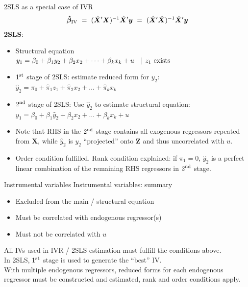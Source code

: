 \documentclass[usenames,dvipsnames]{beamer}
\begin{document}
\begin{frame}{2SLS as a special case of IVR}
$$
 \bm{\hat{\beta}}_{\textnormal{IV}} ~=~ 
 (\hat{\bm{X}}^{\prime}\bm{X})^{-1} \hat{\bm{X}}^{\prime}\bm{y} 
 ~=~ (\hat{\bm{X}}^{\prime}\hat{\bm{X}})^{-1} \hat{\bm{X}}^{\prime}\bm{y}
$$
\textbf{2SLS}: 
\begin{itemize}
\item Structural equation\\
\smallskip
$y_1=\beta_0+\beta_1 y_2+\beta_2 x_2+ \dots + \beta_k x_{k} +u \quad | ~z_1 \textnormal{~exists}$\\
\medskip
\item $1^{\textnormal{st}}$ stage of 2SLS: estimate reduced form for $y_2$:\\
\smallskip
$\hat{y}_2=\hat{\pi}_0+\hat{\pi}_1 z_1 + \hat{\pi}_{2} x_{2} + \dots +\hat{\pi}_k x_k$
\medskip
\item $2^{\textnormal{nd}}$ stage of 2SLS: Use $\hat{y}_2$ to estimate structural equation:\\
\smallskip
$y_1=\beta_0+\beta_1 \hat{y}_2 +\beta_2 x_2+ \dots + \beta_k x_{k} +u$
\smallskip
\item Note that RHS in the $2^{\textnormal{nd}}$ stage contains all exogenous regressors repeated from $\bm{X}$, while $\hat{y}_2$ is $y_2$ ``projected'' onto $\bm{Z}$ and thus uncorrelated with $u$.
\item Order condition fulfilled. Rank condition explained: if $\pi_1=0$, $\hat{y}_2$ is a perfect linear combination of the remaining RHS regressors in $2^{\textnormal{nd}}$ stage.
\end{itemize}
\end{frame}
\begin{frame}{Instrumental variables}
Instrumental variables: summary\\
\vspace{0.3cm}
\begin{itemize}
\item Excluded from the main / structural equation
\item Must be correlated with endogenous regressor(s)
\item Must not be correlated with $u$
\end{itemize}
\vspace{0.3cm}
All IVs used in IVR / 2SLS estimation must fulfill the conditions above.\\
\vspace{0.3cm}
In 2SLS, $1^{\textnormal{st}}$ stage is used to generate the ``best'' IV.\\
With multiple endogenous regressors, reduced forms for each endogenous regressor must be constructed and estimated, rank and order conditions apply.
\end{frame}
\end{document}
